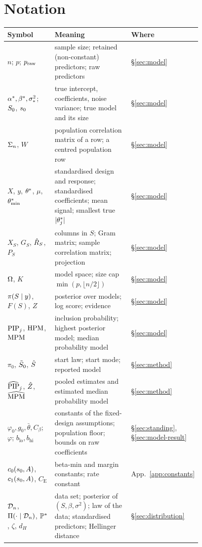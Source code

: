 \section{Notation}\label{app:notation}

\begin{longtable}{@{}p{0.28\linewidth}p{0.5\linewidth}l@{}}
\toprule
Symbol & Meaning & Where \\ \midrule \endhead
$n$; $p$; $\praw$ & sample size; retained (non-constant) predictors; raw predictors & \S\ref{sec:model} \\
$\alpha^*,\bstar,\sigs^2$; $\Sz$, $\sz$ & true intercept, coefficients, noise variance; true model and its size & \S\ref{sec:model} \\
$\Sig$, $W$ & population correlation matrix of a row; a centred population row & \S\ref{sec:model} \\
$X$, $y$, $\tstar$, $\mu$, $\tmin$ & standardised design and response; standardised coefficients; mean signal; smallest true $\abs{\theta^*_j}$ & \S\ref{sec:model} \\
$X_S$, $G_S$, $\Rhat_S$, $P_S$ & columns in $S$; Gram matrix; sample correlation matrix; projection & \S\ref{sec:model} \\
$\Om$, $K$ & model space; size cap $\min(p,\lfloor n/2\rfloor)$ & \S\ref{sec:model} \\
$\pis{S}$, $F(S)$, $Z$ & posterior over models; log score; evidence & \S\ref{sec:model} \\
$\PIP_j$, $\HPM$, $\MPM$ & inclusion probability; highest posterior model; median probability model & \S\ref{sec:model} \\
$\pi_0$, $\tSz$, $\Shat$ & start law; start mode; reported model & \S\ref{sec:method} \\
$\PIPhat_j$, $\Zhat$, $\MPMhat$ & pooled estimates and estimated median probability model & \S\ref{sec:method} \\
$\varphi_0,g_0,\bar\theta,C_\beta$; $\varphi$; $b_{\mathrm{lo}},b_{\mathrm{hi}}$ & constants of the fixed-design assumptions; population floor; bounds on raw coefficients & \S\ref{sec:standing}, \S\ref{sec:model-result} \\
$c_0(\sz,A)$, $c_1(\sz,A)$, $C_{\mathrm E}$ & beta-min and margin constants; rate constant & App.~\ref{app:constants} \\
$\Dn$, $\Pi(\cdot\mid\Dn)$, $\P^*$, $\zeta$, $d_H$ & data set; posterior of $(S,\beta,\sigma^2)$; law of the data; standardised predictors; Hellinger distance & \S\ref{sec:distribution} \\

\end{longtable}
